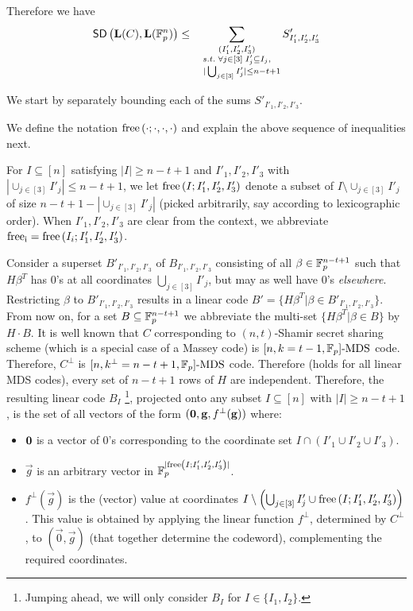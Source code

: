 \noindent Therefore we have
\begin{align} \label{eq:A.12}
\mathsf{SD} \left({\mathbf{L}(C)},{\mathbf{L}(\mathbb{F}^n_p)} \right) \leq \sum_{\substack{(I'_1,I'_2,I'_3)\\ s.t. \; \forall j \in [3] \; I'_j\subseteq I_j, \\ \;\;\;\; | \bigcup_{j \in [3]} I'_j | \leq n-t+1}} S'_{I'_1,I'_2,I'_3}
\end{align}

We start by separately bounding each of the sums $S'_{I'_1,I'_2,I'_3}$.

\noindent We define the notation $\mathrm{free} \left( \cdot;\cdot,\cdot,\cdot \right)$ and explain the above sequence of inequalities next. 

For $I\subseteq [n]$ satisfying $|I|\geq n-t+1$ and $I'_1,I'_2,I'_3$
with $|\cup_{j\in [3]}I'_j|\leq n-t+1$, we let $\mathrm{free} \left( I;I'_1,I'_2,I'_3 \right)$ denote a subset of $I\setminus{\cup_{j\in [3]}I'_j}$ of size $n-t+1-|\cup_{j\in [3]}I'_j|$ (picked arbitrarily, say according to lexicographic order). When $I'_1,I'_2,I'_3$ are clear from the context, we abbreviate $\mathrm{free_i}=\mathrm{free} \left( I_i;I'_1,I'_2,I'_3 \right)$.

Consider a superset $B'_{I'_1,I'_2,I'_3}$ of $B_{I'_1,I'_2,I'_3}$ consisting of all $\beta\in \mathbb{F}^{n-t+1}_p$ such that
$H\beta^T$ has 0's at all coordinates $\bigcup_{j \in [3]} I'_j$, but may as well have $0$'s \emph{elsewhere}.
Restricting $\beta$ to $B'_{I'_1,I'_2,I'_3}$
results in a linear code $B'=\{H\beta^T|\beta\in B'_{I'_1,I'_2,I'_3}\}$.
From now on, for a set $B\subseteq \mathbb{F}^{n-t+1}_p$ we abbreviate the multi-set 
$\{H\beta^T|\beta\in B\}$ by $H\cdot B$.
It is well known that $C$ corresponding to $(n,t)$-Shamir secret sharing scheme (which is a special case of a Massey code) is $[n,k=t-1,\mathbb{F}_p]\text{-MDS}$ code. Therefore, $C^\bot$ 
is $[n,k^\bot = n-t+1,\mathbb{F}_p]\text{-MDS}$ code. Therefore (holds for all linear MDS  codes), every set of $n - t + 1$ rows of $H$ are independent.
Therefore, the resulting linear code $B_I$ \footnote{Jumping ahead, we will only consider $B_I$ for $I\in \{I_1,I_2\}$.}, projected onto any  subset $I\subseteq [n]$ with $|I|\geq n-t+1$, is the set of all vectors of the form $(\mathbf{0},\mathbf{g},f^\bot(\mathbf{g}))$ where: 
\begin{itemize}
\item $\mathbf{0}$ is a vector of 0's corresponding to the coordinate set $I\cap (I'_1\cup I'_2\cup I'_3)$.
\item $\vec{g}$ is an arbitrary vector in $\mathbb{F}^{|\mathrm{free} \left( I;I'_1,I'_2,I'_3 \right)|}_p$.

\item $f^\bot(\vec{g})$ is the (vector) value at coordinates $I\setminus {\left(\bigcup_{j \in [3]} I'_j\cup \mathrm{free} \left( I;I'_1,I'_2,I'_3 \right)  \right)}$.
This value is obtained by applying the linear function $f^\bot$, determined by $C^\bot$, to $(\vec{0},\vec{g})$ (that together determine the codeword), complementing the required coordinates. 
\end{itemize}

